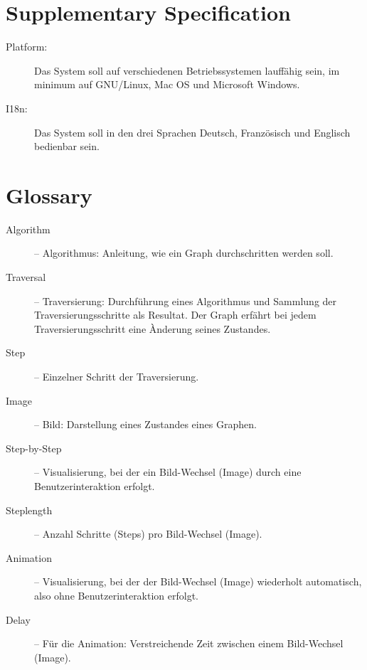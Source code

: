 \section{Supplementary Specification}
\label{sec:Supplementary Specification}
\begin{description}
  \item[Platform:] Das System soll auf verschiedenen Betriebssystemen lauff\"ahig sein, im minimum auf GNU/Linux, Mac OS und Microsoft Windows.
  \item[I18n:] Das System soll in den drei Sprachen Deutsch, Franz\"osisch und Englisch bedienbar sein.
\end{description}
% 
\section{Glossary}
\label{sec:Glossary}
\begin{description}
  \item[Algorithm] -- Algorithmus: Anleitung, wie ein Graph durchschritten werden soll.
  \item[Traversal] -- Traversierung: Durchf\"uhrung eines Algorithmus und Sammlung der Traversierungsschritte als Resultat. Der Graph erf\"ahrt bei jedem Traversierungsschritt eine \`Anderung seines Zustandes.
  \item[Step] -- Einzelner Schritt der Traversierung.
  \item[Image] -- Bild: Darstellung eines Zustandes eines Graphen.
  \item[Step-by-Step] -- Visualisierung, bei der ein Bild-Wechsel (Image) durch eine Benutzerinteraktion erfolgt.
  \item[Steplength] -- Anzahl Schritte (Steps) pro Bild-Wechsel (Image).
  \item[Animation] -- Visualisierung, bei der der Bild-Wechsel (Image) wiederholt automatisch, also ohne Benutzerinteraktion erfolgt.
  \item[Delay] -- F\"ur die Animation: Verstreichende Zeit zwischen einem Bild-Wechsel (Image).
\end{description}
% 
